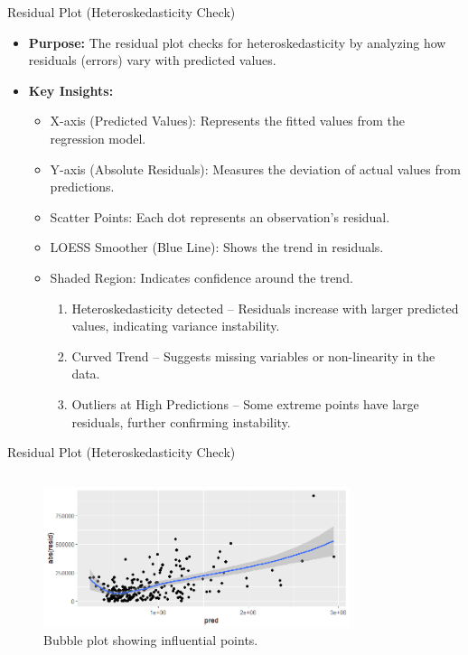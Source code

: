 \documentclass{beamer}
\begin{document}
		\begin{frame}{Residual Plot (Heteroskedasticity Check)}
		\begin{itemize}
			\item \textbf{Purpose:} The residual plot checks for heteroskedasticity by analyzing how residuals (errors) vary with predicted values.
			\item \textbf{Key Insights:}
			\begin{itemize}
				\item X-axis (Predicted Values): Represents the fitted values from the regression model.
				\item Y-axis (Absolute Residuals): Measures the deviation of actual values from predictions.
				\item Scatter Points: Each dot represents an observation’s residual.
				\item LOESS Smoother (Blue Line): Shows the trend in residuals.
				\item Shaded Region: Indicates confidence around the trend.
				\begin{enumerate}
					\item Heteroskedasticity detected – Residuals increase with larger predicted values, indicating variance instability.
					\item  Curved Trend – Suggests missing variables or non-linearity in the data.
					\item Outliers at High Predictions – Some extreme points have large residuals, further confirming instability.
				\end{enumerate}
			\end{itemize}
		\end{itemize}
	\end{frame}
	
	
		
	\begin{frame}{Residual Plot (Heteroskedasticity Check)}
		\begin{columns}
			
			\begin{figure}
				\includegraphics[width=0.8\textwidth]{residual_plot.png}
				\caption{Bubble plot showing influential points.}
			\end{figure}
		\end{columns}
	\end{frame}
	
\end{document}
